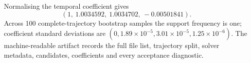 \documentclass[preprint,12pt]{elsarticle}
\begin{document}
Normalising the temporal coefficient gives
\[
(1,\ 1.0034592,\ 1.0034702,\ -0.00501841).
\]
Across 100 complete-trajectory
bootstrap samples the support frequency is one; coefficient standard
deviations are $(0,1.89\times10^{-5},3.01\times10^{-5},1.25\times10^{-6})$.
The machine-readable artifact records the full file list, trajectory split,
solver metadata, candidates, coefficients and every acceptance diagnostic.
\end{document}
